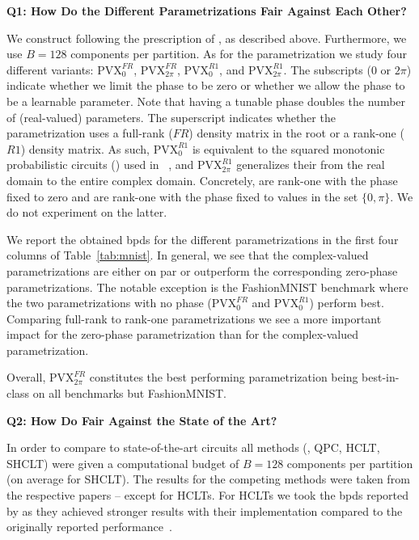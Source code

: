 \textbf{Q1: How Do the Different \pvc Parametrizations Fair Against Each Other?}

We construct \pvcs following the prescription of \cite{zuidberg2024probabilistic}, as described above. Furthermore, we use $B=128$ components per partition.
As for the parametrization we study four different variants:
$\mathrm{PVX}_{0}^{FR}$,
$\mathrm{PVX}_{2\pi}^{FR}$,
$\mathrm{PVX}_{0}^{R1}$, and
$\mathrm{PVX}_{2\pi}^{R1}$.
The subscripts ($0$ or $2\pi$) indicate whether we limit the phase to be zero or whether we allow the phase to be a learnable parameter. Note that having a tunable phase doubles the number of (real-valued) parameters. The superscript indicates whether the parametrization uses a full-rank ($FR$) density matrix in the root or a rank-one ($R1$) density matrix.
As such, $\mathrm{PVX}_{0}^{R1}$ is equivalent to the  squared monotonic probabilistic circuits (\smpcs) used in ~\cite{loconte2024subtractive}, and $\mathrm{PVX}_{2\pi}^{R1}$ generalizes their \snpcs from the real domain to the entire complex domain. Concretely, \smpcs are rank-one \pvcs with the phase fixed to zero and \snpcs are rank-one \pvcs with the phase fixed to values in the set $\{0, \pi \}$. We do not experiment on the latter.

We report the obtained bpds for the different \pvc parametrizations in the first four columns of Table~\ref{tab:mnist}. In general, we see that the complex-valued parametrizations are either on par or outperform the corresponding zero-phase parametrizations.
The notable exception is the FashionMNIST benchmark where the two parametrizations with no phase ($\mathrm{PVX}_{0}^{FR}$ and $\mathrm{PVX}_{0}^{R1}$) perform best.
Comparing full-rank to rank-one parametrizations we see a more important impact for the zero-phase parametrization than for the complex-valued parametrization.


Overall, $\mathrm{PVX}_{2\pi}^{FR}$ constitutes the best performing parametrization being best-in-class on all benchmarks but FashionMNIST.











\textbf{Q2: How Do \pvcs Fair Against the State of the Art?}

In order to compare \pvcs to state-of-the-art circuits all methods (\pvc, QPC, HCLT, SHCLT) were given a computational budget of $B=128$ components per partition (on average for SHCLT).
The results for the competing methods were taken from the respective papers -- except for HCLTs. For HCLTs we took the bpds reported by \citet{gala2024probabilistic} as they achieved stronger results with their implementation compared to the originally reported performance~\citep{liu2021tractable}.

